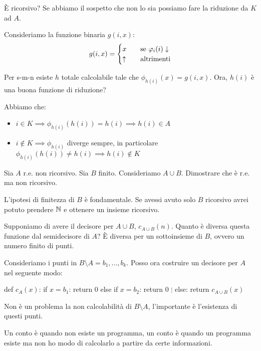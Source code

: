 È ricorsivo? Se abbiamo il sospetto che non lo sia possiamo fare la riduzione da $K$ ad $A$.

Consideriamo la funzione binaria $g(i,x)$:
\begin{equation*}
    g(i,x) =
    \begin{cases}
        x \quad &\text{se $\varphi_{i}(i) \downarrow$} \\
        \uparrow \quad &\text{altrimenti}
    \end{cases}
\end{equation*}

Per s-m-n esiste $h$ totale calcolabile tale che $\phi_{h(i)}(x) = g(i,x)$. Ora, $h(i)$ è una buona funzione di
riduzione?

Abbiamo che:
\begin{itemize}
    \item $i \in K \implies \phi_{h(i)}(h(i)) = h(i) \implies h(i) \in A$
    \item $i \notin K \implies \phi_{h(i)}$ diverge sempre, in particolare $\phi_{h(i)}(h(i)) \not= h(i) \implies
    h(i) \notin K$
\end{itemize}

Sia $A$ r.e. non ricorsivo. Sia $B$ finito. Consideriamo $A \cup B$. Dimostrare che è r.e. ma non
ricorsivo.

L'ipotesi di finitezza di $B$ è fondamentale. Se avessi avuto solo $B$ ricorsivo avrei potuto prendere
$\mathbb{N}$ e ottenere un insieme ricorsivo.

Supponiamo di avere il decisore per $A \cup B$, $c_{A \cup B}(n)$. Quanto è diversa questa funzione dal
semidecisore di $A$? È diversa per un sottoinsieme di $B$, ovvero un numero finito di punti.

Consideriamo i punti in $B \setminus A = {b_{1},\dotsc,b_{k}}$. Posso ora costruire un decisore
per $A$ nel seguente modo:
\begin{python}
def $c_{A}(x)$:
    if $x = b_{1}$:
        return 0
    else if $x = b_{2}$:
        return 0
    $\vdots$
    else:
        return $c_{A \cup B}(x)$
\end{python}

Non è un problema la non calcolabilità di $B \setminus A$, l'importante è l'esistenza di questi
punti.

Un conto è quando non esiste un programma, un conto è quando un programma esiste ma non ho modo di
calcolarlo a partire da certe informazioni.
